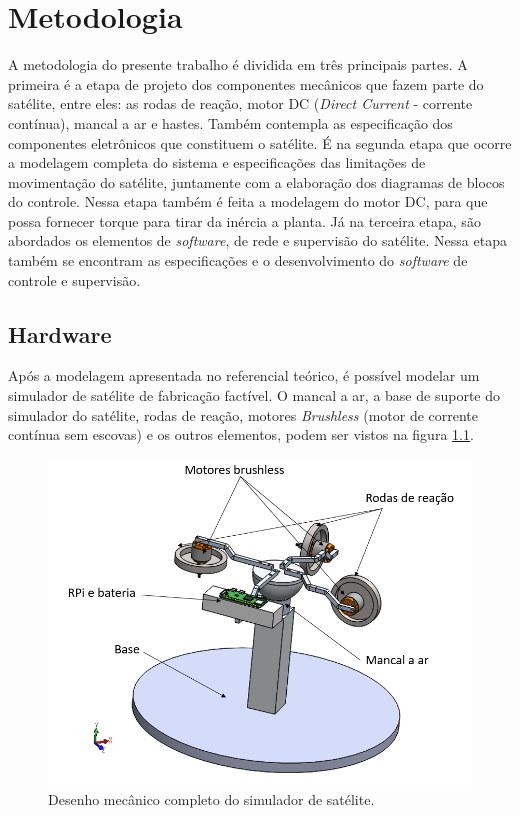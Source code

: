 \chapter{Metodologia}

A metodologia do presente trabalho é dividida em três principais partes. A primeira é a etapa de projeto dos componentes mecânicos que fazem parte do satélite, entre eles: as rodas de reação, motor DC (\textit{Direct Current} - corrente contínua), mancal a ar e hastes. Também contempla as especificação dos componentes eletrônicos que constituem o satélite. É na segunda etapa que ocorre a modelagem completa do sistema e especificações das limitações de movimentação do satélite, juntamente com a elaboração dos diagramas de blocos do controle. Nessa etapa também é feita a modelagem do motor DC, para que possa fornecer torque para tirar da inércia a planta. Já na terceira etapa, são abordados os elementos de \textit{software}, de rede e supervisão do satélite. Nessa etapa também se encontram as especificações e o desenvolvimento do \textit{software} de controle e supervisão.



\section{Hardware}

Após a modelagem apresentada no referencial teórico, é possível modelar um simulador de satélite de fabricação factível.  O mancal a ar, a base de suporte do simulador do satélite, rodas de reação, motores \textit{Brushless} (motor de corrente contínua sem escovas) e os outros elementos, podem ser vistos na figura \ref{fig:satelite_completo}.

\begin{figure}[H]
  \caption{Desenho mecânico completo do simulador de satélite.}
  \begin{center}
      \includegraphics[scale=.5]{metodologia/img/satelite_completo}
  \end{center}
  \label{fig:satelite_completo}
\end{figure}

